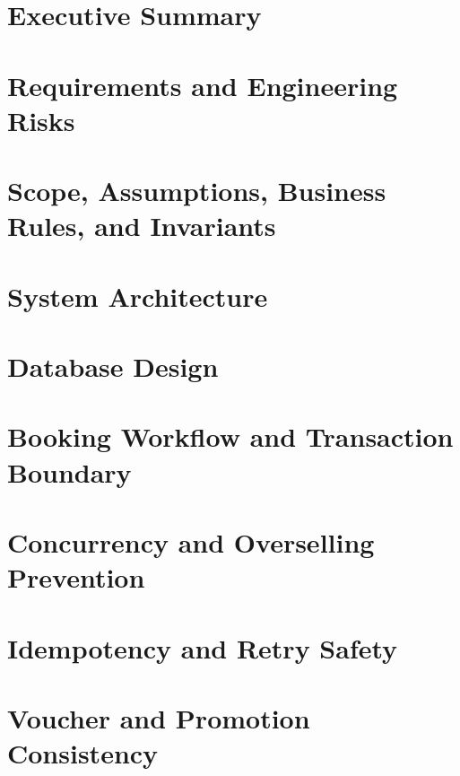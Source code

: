 \documentclass[a4paper,12pt,oneside]{report}
\begin{document}


\setcounter{tocdepth}{0}
\tableofcontents
\clearpage


\chapter{Executive Summary}


\chapter{Requirements and Engineering Risks}


\chapter{Scope, Assumptions, Business Rules, and Invariants}


\chapter{System Architecture}


\chapter{Database Design}


\chapter{Booking Workflow and Transaction Boundary}


\chapter{Concurrency and Overselling Prevention}


\chapter{Idempotency and Retry Safety}


\chapter{Voucher and Promotion Consistency}

\end{document}
